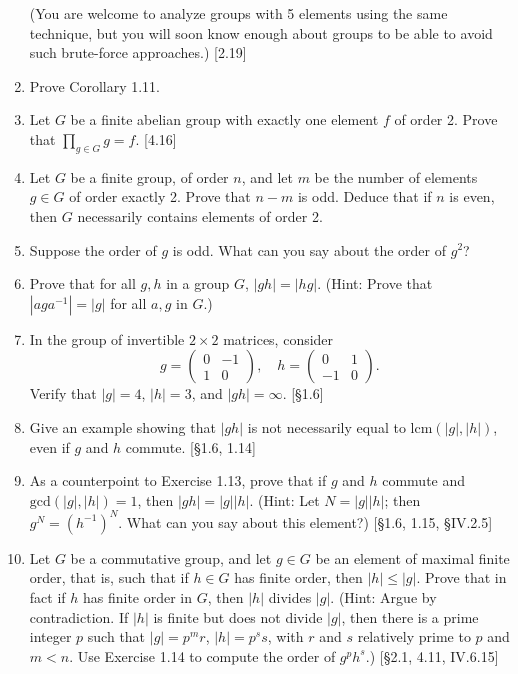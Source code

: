 \begin{enumerate}
          (You are welcome to analyze groups with 5 elements using the same technique, but you will soon know enough about groups to be able to avoid such brute-force approaches.) [2.19]

    \item Prove Corollary 1.11.

    \item Let $G$ be a finite abelian group with exactly one element $f$ of order 2. Prove that $\prod_{g \in G} g = f$. [4.16]

    \item Let $G$ be a finite group, of order $n$, and let $m$ be the number of elements $g \in G$ of order exactly 2. Prove that $n-m$ is odd. Deduce that if $n$ is even, then $G$ necessarily contains elements of order 2.

    \item Suppose the order of $g$ is odd. What can you say about the order of $g^2$?

    \item Prove that for all $g, h$ in a group $G$, $|gh| = |hg|$. (Hint: Prove that $|aga^{-1}| = |g|$ for all $a, g$ in $G$.)

    \item In the group of invertible $2 \times 2$ matrices, consider
          \[
              g = \begin{pmatrix} 0 & -1 \\ 1 & 0 \end{pmatrix}, \quad h = \begin{pmatrix} 0 & 1 \\ -1 & 0 \end{pmatrix}.
          \]
          Verify that $|g|=4$, $|h|=3$, and $|gh|=\infty$. [\S1.6]

    \item Give an example showing that $|gh|$ is not necessarily equal to $\text{lcm}(|g|,|h|)$, even if $g$ and $h$ commute. [\S1.6, 1.14]

    \item As a counterpoint to Exercise 1.13, prove that if $g$ and $h$ commute and $\text{gcd}(|g|, |h|) = 1$, then $|gh| = |g||h|$. (Hint: Let $N = |g||h|$; then $g^N = (h^{-1})^N$. What can you say about this element?) [\S1.6, 1.15, \S IV.2.5]

    \item Let $G$ be a commutative group, and let $g \in G$ be an element of maximal finite order, that is, such that if $h \in G$ has finite order, then $|h| \le |g|$. Prove that in fact if $h$ has finite order in $G$, then $|h|$ divides $|g|$. (Hint: Argue by contradiction. If $|h|$ is finite but does not divide $|g|$, then there is a prime integer $p$ such that $|g| = p^m r$, $|h| = p^s s$, with $r$ and $s$ relatively prime to $p$ and $m < n$. Use Exercise 1.14 to compute the order of $g^p h^s$.) [\S2.1, 4.11, IV.6.15]
\end{enumerate}
